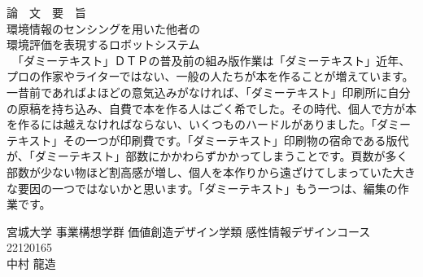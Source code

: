 \begin{center}
  {\Large
    論　文　要　旨\\
    \vspace{2\zh}
    環境情報のセンシングを用いた他者の\\環境評価を表現するロボットシステム\\
    \vspace{2\zh}
  }
  {\normalfont
    　「ダミーテキスト」ＤＴＰの普及前の組み版作業は「ダミーテキスト」近年、プロの作家やライターではない、一般の人たちが本を作ることが増えています。一昔前であればよほどの意気込みがなければ、「ダミーテキスト」印刷所に自分の原稿を持ち込み、自費で本を作る人はごく希でした。その時代、個人で方が本を作るには越えなければならない、いくつものハードルがありました。「ダミーテキスト」その一つが印刷費です。「ダミーテキスト」印刷物の宿命である版代が、「ダミーテキスト」部数にかかわらずかかってしまうことです。頁数が多く部数が少ない物ほど割高感が増し、個人を本作りから遠ざけてしまっていた大きな要因の一つではないかと思います。「ダミーテキスト」もう一つは、編集の作業です。
  }
\end{center}

\vspace{3\zh}

\begin{flushright}
  宮城大学 事業構想学群 価値創造デザイン学類 感性情報デザインコース\\
  22120165\\ %
  中村 龍造\\ %
\end{flushright}
